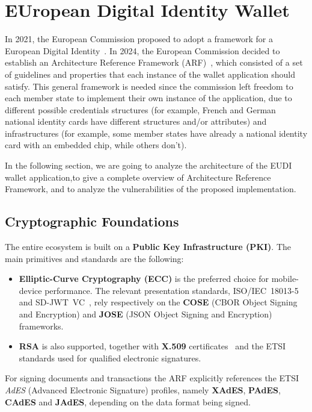 \documentclass[binding=0.6cm,oneside,noexaminfo]{sapthesis}
\begin{document}
\chapter{EUropean Digital Identity Wallet}
\label{eudiw}
In 2021, the European Commission proposed to adopt a framework for a European Digital Identity~\cite{EuropeanCommission2021EUDI}.
In 2024, the European Commission decided to establish an Architecture Reference Framework (ARF)~\cite{EuropeanCommission2024EUDIARF},
which consisted of a set of guidelines and properties that each instance of the wallet application should satisfy.
This general framework is needed since the commission left freedom to each member state to implement their own 
instance of the application, due to different possible credentials structures (for example, French and German national 
identity cards have different structures and/or attributes) and infrastructures (for example, some member states have 
already a national identity card with an embedded chip, while others don't).

In the following section, we are going to analyze the architecture of the EUDI wallet application,to give a complete 
overview of Architecture Reference Framework, and to analyze the vulnerabilities of the proposed implementation.

\section{Cryptographic Foundations}
\label{eudi:crypto}
The entire ecosystem is built on a \textbf{Public Key Infrastructure (PKI)}. The main primitives and standards are the
following:
\begin{itemize}[noitemsep]
  \item \textbf{Elliptic-Curve Cryptography (ECC)} is the preferred choice for mobile-device performance. The relevant
        presentation standards, ISO/IEC~18013-5~\cite{iso18013-5} and SD-JWT~VC~\cite{sdjwtvc}, rely respectively on the
        \textbf{COSE} (CBOR Object Signing and Encryption) and \textbf{JOSE} (JSON Object Signing and Encryption)
        frameworks.
  \item \textbf{RSA} is also supported, together with \textbf{X.509} certificates~\cite{rfc5280} and the ETSI standards
        used for qualified electronic signatures.
\end{itemize}
For signing documents and transactions the ARF explicitly references the ETSI \emph{AdES} (Advanced Electronic
Signature) profiles, namely \textbf{XAdES}, \textbf{PAdES}, \textbf{CAdES} and \textbf{JAdES}, depending on the data
format being signed.
\end{document}
